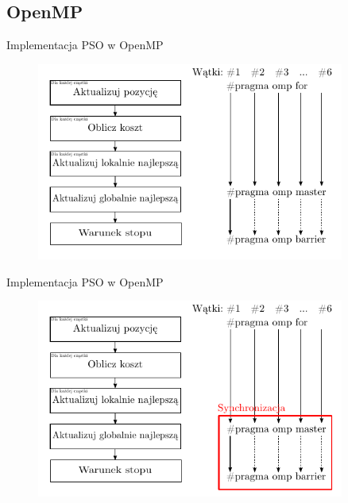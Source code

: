 \documentclass[handout]{beamer}
\begin{document}
\subsection{OpenMP}
\begin{frame}{Implementacja PSO w OpenMP}
\begin{figure}[t]
\includegraphics[width=0.9\textwidth]{grafiki/alg_OpenMP_PSO.pdf}
\end{figure}
\end{frame}

\begin{frame}{Implementacja PSO w OpenMP}
\begin{figure}[t]
\includegraphics[width=0.9\textwidth]{grafiki/alg_OpenMP_synchronizacja.pdf}
\end{figure}
\end{frame}
\end{document}
